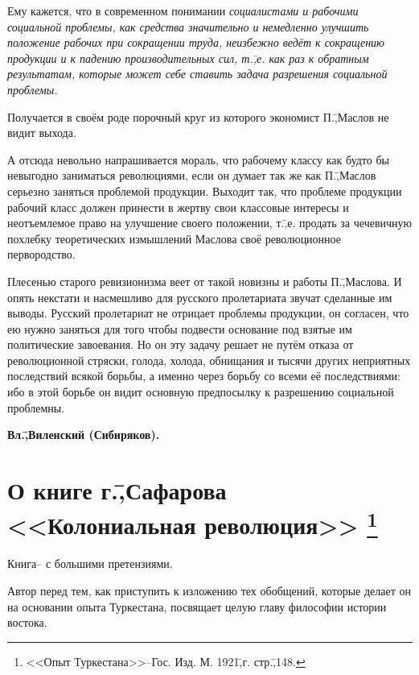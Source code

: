 Ему кажется, что в современном понимании \emph{социалистами и рабочими социальной проблемы, как средства значительно и немедленно улучшить положение рабочих при сокращении труда, неизбежно ведёт к сокращению продукции и к падению производительных сил, т.\=,е. как раз к обратным результатам, которые может себе ставить задача разрешения социальной проблемы.}

Получается в своём роде порочный круг из которого экономист П.\=,Маслов не видит выхода.

А отсюда невольно напрашивается мораль, что рабочему классу как будто бы невыгодно заниматься революциями, если он думает так же как П.\=,Маслов серьезно заняться проблемой продукции. Выходит так, что проблеме продукции рабочий класс должен принести в жертву свои классовые интересы и неотъемлемое право на улучшение своего положении, т.\=,е. продать за чечевичную похлебку теоретических измышлений Маслова своё революционное первородство.

Плесенью старого ревизионизма веет от такой новизны и работы П.\=,Маслова. И опять некстати и насмешливо для русского пролетариата звучат сделанные им выводы. Русский пролетариат не отрицает проблемы продукции, он согласен, что ею нужно заняться для того чтобы подвести основание под взятые им политические завоевания. Но он эту задачу решает не путём отказа от революционной стряски, голода, холода, обнищания и тысячи других неприятных последствий всякой борьбы, а именно через борьбу со всеми её последствиями: ибо в этой борьбе он видит основную предпосылку к разрешению социальной проблемны.

\begin{flushright}
 \textbf{Вл.\=,Виленский (Сибиряков).}\hspace*{2em}
\end{flushright}

\section*{О книге г.\=,Сафарова <<Колониальная революция>> \footnote{<<Опыт Туркестана>>\---Гос. Изд. М. 1921\=,г. стр.\=,148.}}
\label{sec:7}

Книга\--- с большими претензиями.

Автор перед тем, как приступить к изложению тех обобщений, которые делает он на основании опыта Туркестана, посвящает целую главу философии истории востока.

